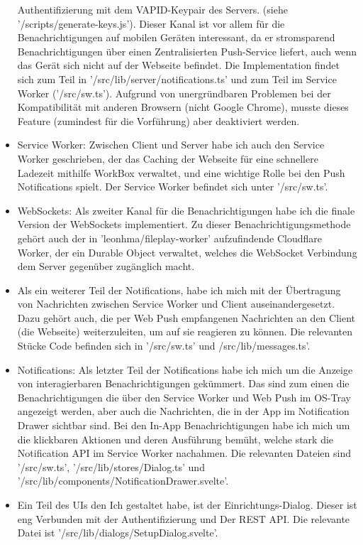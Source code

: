 \documentclass[a4paper]{article}
\begin{document}
\begin{itemize}
            Authentifizierung mit dem VAPID-Keypair des Servers. (siehe
            '/scripts/generate-keys.js'). Dieser Kanal ist vor allem für die
            Benachrichtigungen auf mobilen Geräten interessant, da er
            stromsparend Benachrichtigungen über einen Zentralisierten
            Push-Service liefert, auch wenn das Gerät sich nicht auf der
            Webseite befindet. Die Implementation findet sich zum Teil in
            '/src/lib/server/notifications.ts' und zum Teil im Service Worker
            ('/src/sw.ts'). Aufgrund von unergründbaren Problemen bei der
            Kompatibilität mit anderen Browsern (nicht Google Chrome), musste
            dieses Feature (zumindest für die Vorführung) aber deaktiviert
            werden.
      \item Service Worker: Zwischen Client und Server habe ich auch den Service
            Worker geschrieben, der das Caching der Webseite für eine schnellere
            Ladezeit mithilfe WorkBox verwaltet, und eine wichtige Rolle bei den
            Push Notifications spielt. Der Service Worker befindet sich unter
            '/src/sw.ts'.
      \item WebSockets: Als zweiter Kanal für die Benachrichtigungen habe ich
            die finale Version der WebSockets implementiert. Zu dieser
            Benachrichtigungsmethode gehört auch der in
            'leonhma/fileplay-worker' aufzufindende Cloudflare Worker, der ein
            Durable Object verwaltet, welches die WebSocket Verbindung dem
            Server gegenüber zugänglich macht.
      \item Als ein weiterer Teil der Notifications, habe ich mich mit der
            Übertragung von Nachrichten zwischen Service Worker und Client
            auseinandergesetzt. Dazu gehört auch, die per Web Push empfangenen
            Nachrichten an den Client (die Webseite) weiterzuleiten, um auf sie
            reagieren zu können. Die relevanten Stücke Code befinden sich in
            '/src/sw.ts' und /src/lib/messages.ts'.
      \item Notifications: Als letzter Teil der Notifications habe ich mich um
            die Anzeige von interagierbaren Benachrichtigungen gekümmert. Das
            sind zum einen die Benachrichtigungen die über den Service Worker
            und Web Push im OS-Tray angezeigt werden, aber auch die Nachrichten,
            die in der App im Notification Drawer sichtbar sind. Bei den In-App
            Benachrichtigungen habe ich mich um die klickbaren Aktionen und
            deren Ausführung bemüht, welche stark die Notification API im
            Service Worker nachahmen. Die relevanten Dateien sind '/src/sw.ts',
            '/src/lib/stores/Dialog.ts' und
            '/src/lib/components/NotificationDrawer.svelte'.
      \item Ein Teil des UIs den Ich gestaltet habe, ist der
            Einrichtungs-Dialog. Dieser ist eng Verbunden mit der
            Authentifizierung und Der REST API. Die relevante Datei ist
            '/src/lib/dialogs/SetupDialog.svelte'.
\end{itemize}
\end{document}
